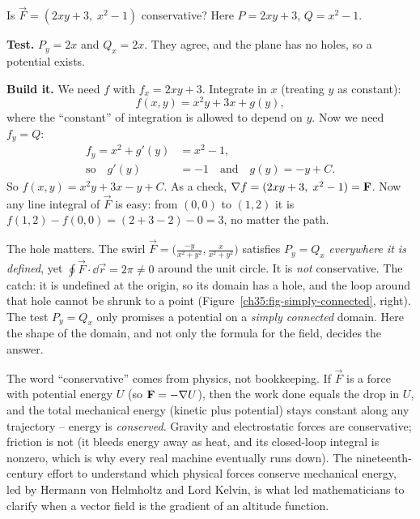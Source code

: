 \begin{example}
\label{ch35:ex-potential}
Is $\vec F=(2xy + 3,\; x^2 - 1)$ conservative? Here $P=2xy+3$, $Q=x^2-1$.

\textbf{Test.} $P_y = 2x$ and $Q_x = 2x$. They agree, and the plane has no holes,
so a potential exists.

\textbf{Build it.} We need $f$ with $f_x = 2xy+3$. Integrate in $x$ (treating $y$
as constant):
\[
  f(x,y) = x^2 y + 3x + g(y),
\]
where the ``constant'' of integration is allowed to depend on $y$. Now we need
$f_y = Q$:
\begin{align*}
  f_y = x^2 + g'(y) &= x^2 - 1,\\
  \text{so}\quad g'(y) &= -1 \quad\text{and}\quad g(y) = -y + C.
\end{align*}
So $f(x,y) = x^2y + 3x - y + C$. As a check, $\nabla f = (2xy+3,\; x^2-1)=\mathbf{F}$.
Now any line integral of $\vec F$ is easy: from $(0,0)$ to $(1,2)$ it is
$f(1,2)-f(0,0) = (2 + 3 - 2) - 0 = 3$, no matter the path.
\end{example}

\begin{trapbox}
The hole matters. The swirl
$\vec F = \big(\frac{-y}{x^2+y^2}, \frac{x}{x^2+y^2}\big)$ satisfies $P_y=Q_x$
\emph{everywhere it is defined}, yet $\oint \vec F\cdot\dd\vec r = 2\pi \ne 0$
around the unit circle. It is \emph{not} conservative. The catch: it is undefined
at the origin, so its domain has a hole, and the loop around that hole cannot be
shrunk to a point (Figure~\ref{ch35:fig-simply-connected}, right). The test
$P_y=Q_x$ only promises a potential on a \emph{simply connected} domain. Here the
shape of the domain, and not only the formula for the field, decides the answer.
\end{trapbox}

\begin{connectionbox}
The word ``conservative'' comes from physics, not bookkeeping. If $\vec F$ is a
force with potential energy $U$ (so $\mathbf{F}=-\nabla U$), then the work done equals
the drop in $U$, and the total mechanical energy (kinetic plus potential) stays
constant along any trajectory -- energy is \emph{conserved}. Gravity
and electrostatic forces are conservative; friction is not (it bleeds energy away as
heat, and its closed-loop integral is nonzero, which is why every real machine
eventually runs down). The nineteenth-century effort to understand which physical
forces conserve mechanical energy, led by Hermann von Helmholtz and Lord
Kelvin, is what led mathematicians to clarify when a vector field is the
gradient of an altitude function.
\end{connectionbox}

